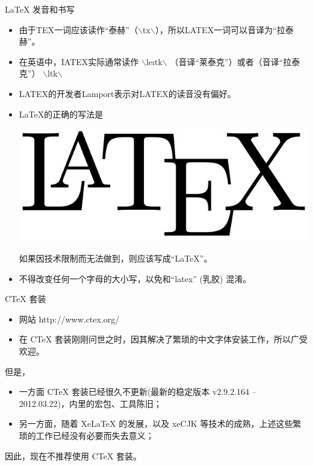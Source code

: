 \documentclass[13pt,fontset=mac]{ctexbeamer}
\begin{document}
\begin{frame}{LaTeX 发音和书写}
	\begin{itemize}
\item 	由于TEX一词应该读作“泰赫”（$\backslash$t\textepsilon x$\backslash$），所以LATEX一词可以音译为“拉泰赫”。
\item 
	在英语中，IATEX实际通常读作
$\backslash$le\i t\textepsilon k$\backslash$
（音译“莱泰克”）或者（音译“拉泰克”）
$\backslash$l\textscripta\textlengthmark t\textepsilon k$\backslash$
\item 
	LATEX的开发者Lamport表示对LATEX的读音没有偏好。
		\end{itemize}
	\vspace{15pt}
		\begin{itemize}
\item 
LaTeX的正确的写法是
\begin{center}
\includegraphics[scale=0.08]{LATEX.jpg}
\end{center}
如果因技术限制而无法做到，则应该写成“LaTeX”。
\item 
不得改变任何一个字母的大小写，以免和“latex” (乳胶) 混淆。
	\end{itemize}

	
	

	
	

\end{frame}



\begin{frame}{CTeX 套装}


\begin{itemize}
	\item 网站  http://www.ctex.org/
	\item 在 CTeX 套装刚刚问世之时，因其解决了繁琐的中文字体安装工作，所以广受欢迎。
\end{itemize}
 但是，
\begin{itemize}
	\item  一方面 CTeX 套装已经很久不更新(最新的稳定版本	v2.9.2.164 -- 2012.03.22)，内里的宏包、工具陈旧；
	\item 另一方面，随着 XeLaTeX 的发展，以及 xeCJK 等技术的成熟，上述这些繁琐的工作已经没有必要而失去意义；
\end{itemize}

	因此，\alert{现在不推荐使用 CTeX 套装}。
	


\end{frame}
\end{document}
